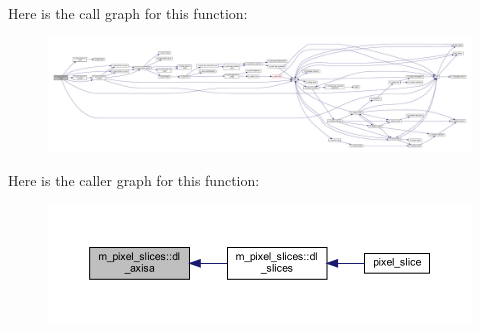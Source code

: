 Here is the call graph for this function\+:
\nopagebreak
\begin{figure}[H]
\begin{center}
\leavevmode
\includegraphics[width=350pt]{namespacem__pixel__slices_afcc122fe448b5f806c0a372a203cd9ea_cgraph}
\end{center}
\end{figure}
Here is the caller graph for this function\+:
\nopagebreak
\begin{figure}[H]
\begin{center}
\leavevmode
\includegraphics[width=350pt]{namespacem__pixel__slices_afcc122fe448b5f806c0a372a203cd9ea_icgraph}
\end{center}
\end{figure}
\mbox{\label{namespacem__pixel__slices_ab70907b4409a4346c450488b5bcb34a8}} 
